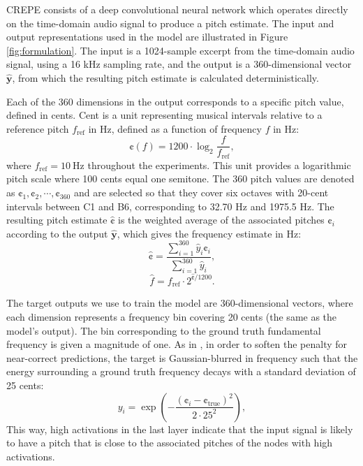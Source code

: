 CREPE consists of a deep convolutional neural network which operates directly on the time-domain audio signal to produce a pitch estimate.
The input and output representations used in the model are illustrated in Figure \ref{fig:formulation}.
The input is a 1024-sample excerpt from the time-domain audio signal, using a 16 kHz sampling rate, and the output is a 360-dimensional vector $\hat{\mathbf{y}}$, from which the resulting pitch estimate is calculated deterministically.

Each of the 360 dimensions in the output corresponds to a specific pitch value, defined in cents.
Cent is a unit representing musical intervals relative to a reference pitch $f_{\mathrm{ref}}$ in Hz, defined as a function of frequency $f$ in Hz:
\begin{equation}
\cent(f) = 1200 \cdot \log_2 \frac{f}{f_{\mathrm{ref}}},
\end{equation}
where $f_{\mathrm{ref}} = 10 \mathrm{~Hz}$ throughout the experiments. 
This unit provides a logarithmic pitch scale where 100 cents equal one semitone.
The 360 pitch values are denoted as $\cent_1, \cent_2, \cdots, \cent_{360}$ and are selected so that they cover six octaves with 20-cent intervals between C1 and B6, corresponding to 32.70 Hz and 1975.5 Hz. 
The resulting pitch estimate $\hat{\cent}$ is the weighted average of the associated pitches $\cent_i$ according to the output $\hat{\mathbf{y}}$, which gives the frequency estimate in Hz:
\begin{equation}\label{eqn:resulting}
\hat{\cent} = \frac{\sum_{i=1}^{360}\hat{y}_i \cent_i}{\sum_{i=1}^{360} \hat{y}_i},
\end{equation}
\begin{equation}\label{eqn:resulting2}
\hat{f} = f_{\mathrm{ref}} \cdot 2 ^ {\hat{\cent} / 1200}.
\end{equation}

The target outputs we use to train the model are 360-dimensional vectors, where each dimension represents a frequency bin covering 20 cents (the same as the model's output).
The bin corresponding to the ground truth fundamental frequency is given a magnitude of one.
As in , in order to soften the penalty for near-correct predictions, the target is Gaussian-blurred in frequency such that the energy surrounding a ground truth frequency decays with a standard deviation of 25 cents:
\begin{equation}\label{eqn:gaussian}
y_i = \exp \left ( {-\frac{(\cent_i - \cent_{\mathrm{true}})^2}{2 \cdot 25^2}} \right ),
\end{equation}
This way, high activations in the last layer indicate that the input signal is likely to have a pitch that is close to the associated pitches of the nodes with high activations.

